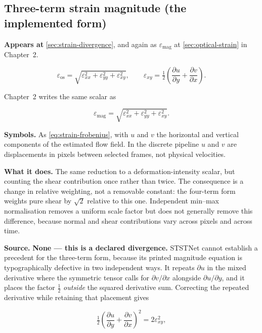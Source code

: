\subsection{Three-term strain magnitude (the implemented form)}
\label{eq:strain-implemented}

\textbf{Appears at} \autoref{sec:strain-divergence}, and again as
$\varepsilon_{\mathrm{mag}}$ at \autoref{sec:optical-strain} in Chapter~2.

\[
    \varepsilon_{\mathrm{os}}
    =\sqrt{\varepsilon_{xx}^{2}+\varepsilon_{yy}^{2}
        +\varepsilon_{xy}^{2}},
    \qquad
    \varepsilon_{xy}=\tfrac{1}{2}
        \left(\frac{\partial u}{\partial y}
             +\frac{\partial v}{\partial x}\right).
\]

Chapter~2 writes the same scalar as

\[
    \varepsilon_{\mathrm{mag}}
       =\sqrt{\varepsilon_{xx}^2+\varepsilon_{yy}^2
                    +\varepsilon_{xy}^2}.
\]

\textbf{Symbols.} As \autoref{eq:strain-frobenius}, with $u$ and $v$ the
horizontal and vertical components of the estimated flow field. In the
discrete pipeline $u$ and $v$ are displacements in pixels between selected
frames, not physical velocities.

\textbf{What it does.} The same reduction to a deformation-intensity scalar,
but counting the shear contribution once rather than twice. The consequence is
a change in relative weighting, not a removable constant: the four-term form
weights pure shear by $\sqrt{2}$ relative to this one. Independent min--max
normalisation removes a uniform scale factor but does not generally remove
this difference, because normal and shear contributions vary across pixels and
across time.

\textbf{Source.} \textbf{None --- this is a declared divergence.} STSTNet
\cite{liong2019b} cannot establish a precedent for the three-term form,
because its printed magnitude equation is typographically defective in two
independent ways. It repeats $\partial u$ in the mixed derivative where the
symmetric tensor calls for $\partial v / \partial x$ alongside $\partial u /
\partial y$, and it places the factor $\tfrac{1}{2}$ \emph{outside} the
squared derivative sum. Correcting the repeated derivative while retaining
that placement gives

\[
    \tfrac{1}{2}
       \left(\frac{\partial u}{\partial y}
            +\frac{\partial v}{\partial x}\right)^2
       =2\varepsilon_{xy}^{2},
\]

